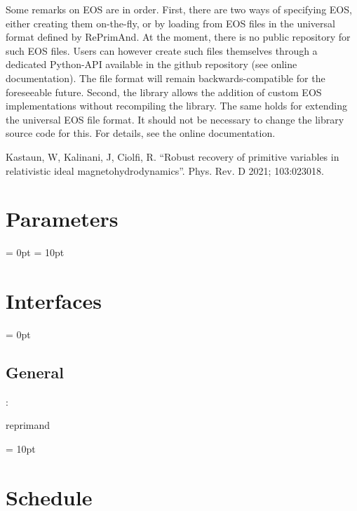 Some remarks on EOS are in order. 
First, there are two ways of specifying EOS, either creating them on-the-fly, or by loading 
from EOS files in the universal format defined by RePrimAnd. At the moment, there is no public repository 
for such EOS files. Users can however create such files themselves through a dedicated Python-API available in the 
github repository (see online documentation). The file format will remain backwards-compatible for the foreseeable future.
Second, the library allows the addition of custom EOS implementations without recompiling the library.
The same holds for extending the universal EOS file format. It should not be necessary to change the library 
source code for this. For details, see the online documentation.

\begin{thebibliography}{9}
Kastaun, W, Kalinani, J, Ciolfi, R. ``Robust recovery of primitive variables in
relativistic ideal magnetohydrodynamics''. Phys. Rev. D 2021; 103:023018.
\end{thebibliography}




\section{Parameters} 


\parskip = 0pt
\parskip = 10pt 

\section{Interfaces} 


\parskip = 0pt

\vspace{3mm} \subsection*{General}

: 

reprimand
\vspace{2mm}

\vspace{5mm}\parskip = 10pt 

\section{Schedule} 



